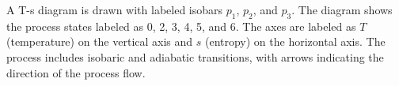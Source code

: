 A T-s diagram is drawn with labeled isobars \( p_1 \), \( p_2 \), and \( p_3 \). The diagram shows the process states labeled as 0, 2, 3, 4, 5, and 6. The axes are labeled as \( T \) (temperature) on the vertical axis and \( s \) (entropy) on the horizontal axis. The process includes isobaric and adiabatic transitions, with arrows indicating the direction of the process flow.